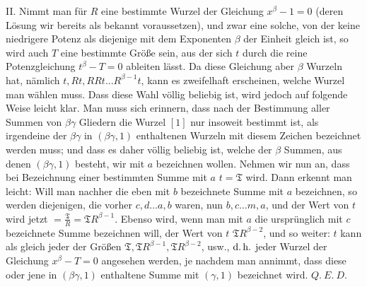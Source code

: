 II. Nimmt man für \(R\) eine bestimmte Wurzel der Gleichung \(x^\beta-1=0\) (deren Lösung wir bereits als bekannt voraussetzen), und zwar eine solche, von der keine niedrigere Potenz als diejenige mit dem Exponenten \(\beta\) der Einheit gleich ist, so wird auch \(T\) eine bestimmte Größe sein, aus der sich \(t\) durch die reine Potenzgleichung \(t^\beta-T=0\) ableiten lässt. Da diese Gleichung aber \(\beta\) Wurzeln hat, nämlich \(t,\allowbreak Rt,\allowbreak RRt\ldots R^{\beta-1}t\), kann es zweifelhaft erscheinen, welche Wurzel man wählen muss. Dass diese Wahl völlig beliebig ist, wird jedoch auf folgende Weise leicht klar. Man muss sich erinnern, dass nach der Bestimmung aller Summen von \(\beta\gamma\) Gliedern die Wurzel \([1]\) nur insoweit bestimmt ist, als irgendeine der \(\beta\gamma\) in \((\beta\gamma,1)\) enthaltenen Wurzeln mit diesem Zeichen bezeichnet werden muss; und dass es daher völlig beliebig ist, welche der \(\beta\) Summen, aus denen \((\beta\gamma,1)\) besteht, wir mit \(a\) bezeichnen wollen. Nehmen wir nun an, dass bei Bezeichnung einer bestimmten Summe mit \(a\) \(t=\mathfrak{T}\) wird. Dann erkennt man leicht: Will man nachher die eben mit \(b\) bezeichnete Summe mit \(a\) bezeichnen, so werden diejenigen, die vorher \(c,\allowbreak d\ldots a,\allowbreak b\) waren, nun \(b,\allowbreak c\ldots m,\allowbreak a\), und der Wert von \(t\) wird jetzt \(=\frac{\mathfrak{T}}R=\mathfrak{T}R^{\beta-1}\). Ebenso wird, wenn man mit \(a\) die ursprünglich mit \(c\) bezeichnete Summe bezeichnen will, der Wert von \(t\) \(\mathfrak{T}R^{\beta-2}\), und so weiter: \(t\) kann als gleich jeder der Größen \(\mathfrak{T},\allowbreak \mathfrak{T}R^{\beta-1},\allowbreak \mathfrak{T}R^{\beta-2}\), usw., \(\text{d.\,h.}\) jeder Wurzel der Gleichung \(x^\beta-T=0\) angesehen werden, je nachdem man annimmt, dass diese oder jene in \((\beta\gamma,1)\) enthaltene Summe mit \((\gamma,1)\) bezeichnet wird. \(Q.\ E.\ D.\)

